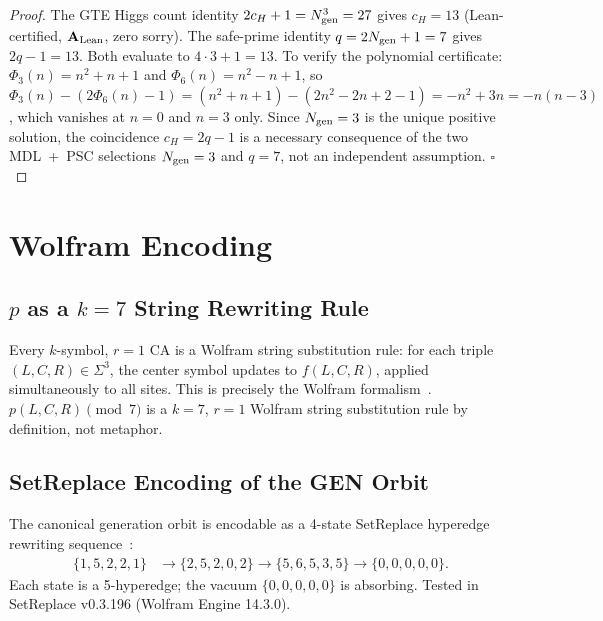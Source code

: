 \documentclass[11pt]{article}
\theoremstyle{remark}
\newcommand{\CatAL}{\texorpdfstring{\ensuremath{\textbf{A}_{\rm Lean}}}{A-Lean}}
\begin{document}
\begin{proof}
The GTE Higgs count identity $2c_H + 1 = N_{\rm gen}^3 = 27$ gives $c_H = 13$
(Lean-certified, \CatAL{}, zero sorry). The safe-prime identity $q = 2N_{\rm gen}+1 = 7$
gives $2q-1 = 13$. Both evaluate to $4\cdot 3 + 1 = 13$.
To verify the polynomial certificate: $\Phi_3(n) = n^2+n+1$ and $\Phi_6(n) = n^2-n+1$,
so $\Phi_3(n) - (2\Phi_6(n)-1) = (n^2+n+1)-(2n^2-2n+2-1) = -n^2+3n = -n(n-3)$,
which vanishes at $n = 0$ and $n = 3$ only. Since $N_{\rm gen} = 3$ is the unique
positive solution, the coincidence $c_H = 2q-1$ is a necessary consequence of the
two MDL~+~PSC selections $N_{\rm gen} = 3$ and $q = 7$, not an independent assumption.
$\square$
\end{proof}

\section{Wolfram Encoding}
\label{sec:wolfram}

\subsection{\texorpdfstring{$p$}{p} as a \texorpdfstring{$k = 7$}{k = 7} String Rewriting Rule}

Every $k$-symbol, $r{=}1$ CA is a Wolfram string substitution rule: for each
triple $(L,C,R) \in \Sigma^3$, the center symbol updates to $f(L,C,R)$, applied
simultaneously to all sites. This is precisely the Wolfram formalism~\cite{Wolfram2002}.
$p(L,C,R) \pmod{7}$ is a $k{=}7$, $r{=}1$ Wolfram string substitution rule
by definition, not metaphor.

\subsection{SetReplace Encoding of the GEN Orbit}

The canonical generation orbit is encodable as a 4-state SetReplace
hyperedge rewriting sequence~\cite{Wolfram2020Tech}:
\begin{align*}
  \{1,5,2,2,1\} &\to \{2,5,2,0,2\} \to \{5,6,5,3,5\} \to \{0,0,0,0,0\}.
\end{align*}
Each state is a 5-hyperedge; the vacuum $\{0,0,0,0,0\}$ is absorbing.
Tested in SetReplace v0.3.196 (Wolfram Engine 14.3.0).
\end{document}
